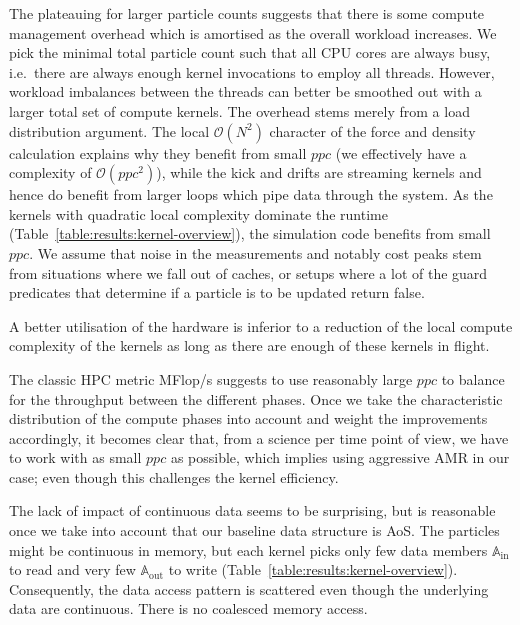 %
%
The plateauing for larger particle counts suggests that there is some compute management overhead which is amortised as the overall workload increases.
We pick the minimal total particle count such that all CPU cores are always busy, i.e.~there are always enough kernel invocations to employ all threads.
However, workload imbalances between the threads can better be smoothed out with a larger total set of compute kernels.
The overhead stems merely from a load distribution argument.
The local $\mathcal{O}(N^2)$ character of the force and density calculation explains why they benefit from small $ppc$ (we effectively have a complexity of $\mathcal{O}(ppc^2)$), while the kick and drifts are streaming kernels and hence do benefit from larger loops which pipe data through the system.
As the kernels with quadratic local complexity dominate the runtime (Table~\ref{table:results:kernel-overview}), the simulation code benefits from small $ppc$.
We assume that noise in the measurements and notably cost peaks stem from situations where we fall out of caches, or setups where a lot of the guard predicates that determine if a particle is to be updated return false.


\begin{observation}
 A better utilisation of the hardware is inferior to a reduction of the local compute complexity of the kernels as long as there are enough of these kernels in flight. 
\end{observation}

%
%

\noindent
The classic HPC metric MFlop/s suggests to use reasonably large $ppc$ to balance for the throughput between the different phases.
Once we take the characteristic distribution of the compute phases into account and weight the improvements accordingly, it becomes clear that, from a science per time point of view, we have to work with as small $ppc$ as possible, which implies using aggressive AMR in our case;
even though this challenges the kernel efficiency.


The lack of impact of continuous data seems to be surprising, but is reasonable once we take into account that our baseline data structure is AoS. 
The particles might be continuous in memory, but each kernel picks only few data members $\mathbb{A}_{\text{in}}$ to read and very few $\mathbb{A}_{\text{out}}$ to write (Table~\ref{table:results:kernel-overview}).
Consequently, the data access pattern is scattered even though the underlying data are continuous.
There is no coalesced memory access.

